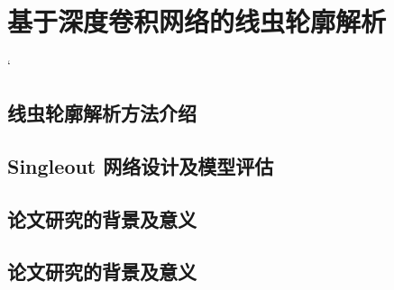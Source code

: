 \chapter{基于深度卷积网络的线虫轮廓解析}
	`
\section{线虫轮廓解析方法介绍}

\section{Singleout 网络设计及模型评估}


\section{论文研究的背景及意义}

\section{论文研究的背景及意义}